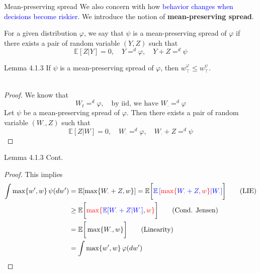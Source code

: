 \begin{frame}{Mean-preserving spread}
    We also concern with how \textcolor{blue}{behavior changes when decisions become riskier}. We introduce the notion of \textbf{mean-preserving spread}.
    
    \begin{definition}
        For a given distribution $\varphi$, we say that $\psi$ is a mean-preserving spread of $\varphi$ if there exists a pair of random variable $(Y,Z)$ such that
    $$
    \mathbb{E}[Z|Y] = 0,\quad Y=^d \varphi, \quad Y+Z=^d\psi 
    $$
    \end{definition}
\end{frame}

\begin{frame}{Lemma 4.1.3}
If $\psi$ is a mean-preserving spread of $\varphi$, then $w_\top^\varphi\le w_\top^\psi$.\\
\\
\begin{proof}
    We know that
$$
W_t =^d \varphi,\quad\text{by iid, we have $W_\cdot =^d \varphi$}
$$
Let $\psi$ be a mean-preserving spread of $\varphi$. Then there exists a pair of random variable $(W_\cdot,Z)$ such that
$$
\mathbb{E}[Z|W] = 0,\quad W_\cdot=^d\varphi, \quad W_\cdot+Z=^d\psi
$$
\end{proof}
\end{frame}
\begin{frame}{Lemma 4.1.3 Cont.}
\begin{proof}
    This implies
\begin{align*}
    \int\max\{w',w\}\,\psi(dw') &= \mathbb{E}[\max\{W_\cdot+Z, w\}]= \mathbb{E}\bigg[\textcolor{blue}{\mathbb{E}\left[\textcolor{red}{\max\{}W_\cdot+Z, \textcolor{red}{w\}}|W_\cdot\right]}\bigg]\tag{LIE}\\
    &\ge \mathbb{E}\bigg[\textcolor{red}{\max\{}\textcolor{blue}{\mathbb{E}[W_\cdot+Z|W_\cdot]},\textcolor{red}{w\}}\bigg]\tag{Cond. Jensen}\\
    &= \mathbb{E}\bigg[\max\{W_\cdot,w\}\bigg]\tag{Linearity}\\
    &= \int\max\{w',w\}\,\varphi(dw')
\end{align*}
\end{proof}
    
\end{frame}